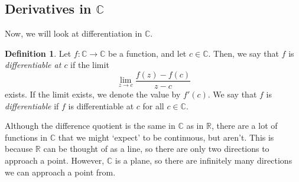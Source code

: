 \documentclass[a4paper, openany]{memoir}
\theoremstyle{definition}
\newtheorem{definition}{Definition}[section]
\theoremstyle{plain}
\begin{document}

\subsection{Derivatives in $\mathbb{C}$}
Now, we will look at differentiation in $\mathbb{C}$.
\begin{definition}
Let $f: \mathbb{C} \to \mathbb{C}$ be a function, and let $c \in \mathbb{C}$. Then, we say that $f$ is \emph{differentiable at $c$} if the limit
\[\lim_{z \to c} \frac{f(z) - f(c)}{z - c}\]
exists. If the limit exists, we denote the value by $f'(c)$. We say that $f$ is \emph{differentiable} if $f$ is differentiable at $c$ for all $c \in \mathbb{C}$.
\end{definition}
\noindent Although the difference quotient is the same in $\mathbb{C}$ as in $\mathbb{R}$, there are a lot of functions in $\mathbb{C}$ that we might `expect' to be continuous, but aren't. This is because $\mathbb{R}$ can be thought of as a line, so there are only two directions to approach a point. However, $\mathbb{C}$ is a plane, so there are infinitely many directions we can approach a point from.
\end{document}
